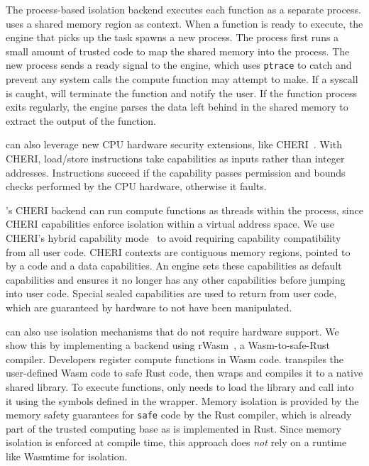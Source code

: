 The process-based isolation backend executes each function as a separate process.
\dandelion uses a shared memory region as context.
When a function is ready to execute, the engine that picks up the task spawns a new process.
The process first runs a small amount of trusted code
to map the shared memory into the process.
The new process sends a ready signal to the engine, which uses \texttt{ptrace} to catch and prevent any system calls the compute function may attempt to make. If a syscall is caught, \dandelion will terminate the function and notify the user.
If the function process exits regularly, the engine parses the data left behind in the shared memory to extract the output of the function. 

 \dandelion can also leverage new CPU hardware security extensions, like CHERI~\cite{cheri}.
With CHERI, load/store instructions take capabilities as inputs rather than integer addresses. 
Instructions succeed if the capability passes permission and bounds checks performed by the CPU hardware, otherwise it faults.
 
\dandelion's CHERI backend can run compute functions as threads within the \dandelion process, since CHERI capabilities enforce isolation within a virtual address space.
We use CHERI's hybrid capability mode~\cite{cheri} to avoid requiring capability compatibility from all user code.
CHERI contexts are contiguous memory regions, pointed to by a code and a data capabilities.
An engine sets these capabilities as default capabilities and ensures it no longer has any other capabilities before jumping into user code.
Special sealed capabilities are used to return from user code, which are guaranteed by hardware to not have been manipulated. 

\dandelion can also use isolation mechanisms that do not require hardware support.
We show this by implementing a backend using rWasm~\cite{rwasm}, a Wasm-to-safe-Rust compiler.
Developers register compute functions in Wasm code.
\dandelion transpiles the user-defined Wasm code to safe Rust code, then wraps and compiles it to a native shared library.
To execute functions, \dandelion only needs to load the library and call into it using the symbols defined in the wrapper.
Memory isolation is provided by the memory safety guarantees for \texttt{safe} code by the Rust compiler, which is already part of the trusted computing base as \dandelion is implemented in Rust. Since memory isolation is enforced at compile time, this approach does \textit{not} rely on a runtime like Wasmtime for isolation.

